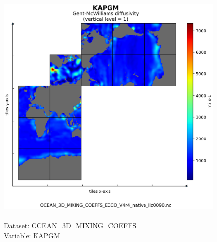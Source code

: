 \begin{figure}[H]
\centering
\includegraphics[scale=0.5]{../images/plots/native_plots/Ocean_3D_Gent-Mcwilliams_Redi_and_Background_Vertical_Diffusivity_Coefficients_for_the_Lat-Lon-Cap_90_(llc90)_Native_Model_Grid_(Version_4_Release_4)/KAPGM.png}
\caption{\\Dataset: OCEAN\_3D\_MIXING\_COEFFS\\Variable: KAPGM}
\label{tab:table-OCEAN_3D_MIXING_COEFFS_KAPGM-Plot}
\end{figure}
\pagebreak
